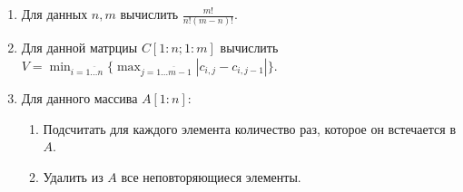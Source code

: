 \begin{enumerate}
    \item Для данных \(n, m\) вычислить \(\frac{m!}{n!(m - n)!}\). 
    \item Для данной матрциы \(C[1{:}n; 1{:}m]\) вычислить \(\displaystyle V = \min_{i = \overline{1\dots n}}\{\max_{j = \overline{1\dots m - 1}} \left\vert c_{i,j} - c_{i,j-1} \right\vert\}\).
    \item Для данного массива \(A[1{:}n]\):
    \begin{enumerate}
        \item Подсчитать для каждого элемента количество раз, которое он встечается в \(A\).
        \item Удалить из \(A\) все неповторяющиеся элементы. 
    \end{enumerate}
\end{enumerate}